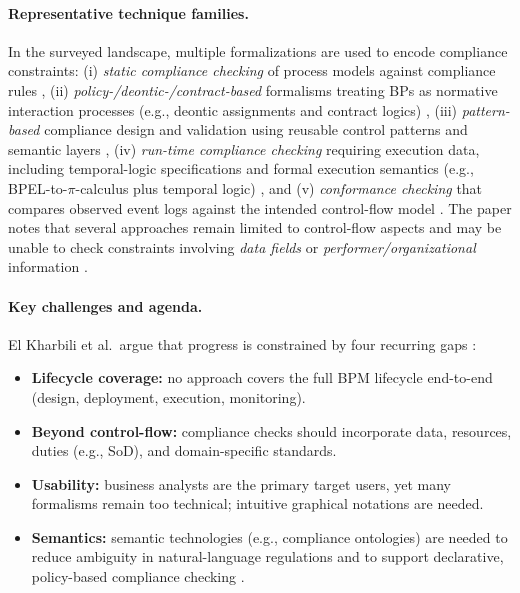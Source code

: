 \paragraph{Representative technique families.}
In the surveyed landscape, multiple formalizations are used to encode compliance constraints:
(i) \emph{static compliance checking} of process models against compliance rules \cite{LMX07},
(ii) \emph{policy-/deontic-/contract-based} formalisms treating BPs as normative interaction processes
(e.g., deontic assignments and contract logics) \cite{PR,Mil05b,GG06,GZ05,MOS06,SGN07},
(iii) \emph{pattern-based} compliance design and validation using reusable control patterns and semantic layers
\cite{NS07a,NS07b,NS08},
(iv) \emph{run-time compliance checking} requiring execution data, including temporal-logic specifications and
formal execution semantics (e.g., BPEL-to-$\pi$-calculus plus temporal logic) \cite{Mi93,DF06,GH01},
and (v) \emph{conformance checking} that compares observed event logs against the intended control-flow model
\cite{RA08,ABD05}. The paper notes that several approaches remain limited to control-flow aspects and may be
unable to check constraints involving \emph{data fields} or \emph{performer/organizational} information \cite{elkharbili2008bpcc}.

\paragraph{Key challenges and agenda.}
El Kharbili et al.\ argue that progress is constrained by four recurring gaps \cite{elkharbili2008bpcc}:
\begin{itemize}
  \item \textbf{Lifecycle coverage:} no approach covers the full BPM lifecycle end-to-end (design, deployment, execution, monitoring).
  \item \textbf{Beyond control-flow:} compliance checks should incorporate data, resources, duties (e.g., SoD), and domain-specific standards.
  \item \textbf{Usability:} business analysts are the primary target users, yet many formalisms remain too technical; intuitive graphical notations are needed.
  \item \textbf{Semantics:} semantic technologies (e.g., compliance ontologies) are needed to reduce ambiguity in natural-language regulations and to
  support declarative, policy-based compliance checking \cite{SBO07,LGRMD08,FY07}.
\end{itemize}

